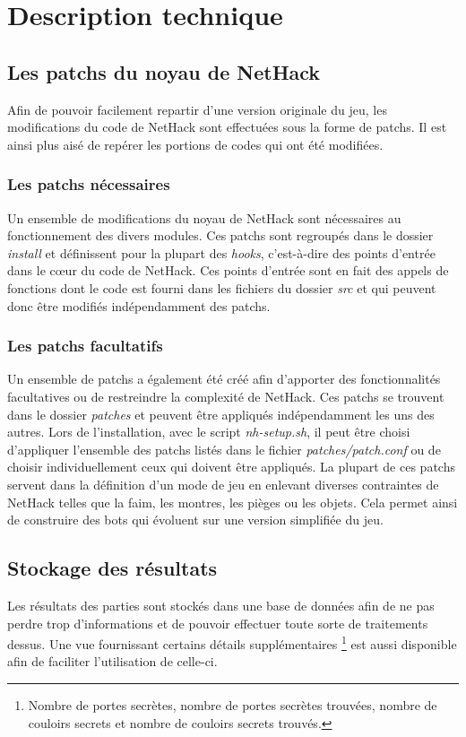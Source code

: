 \documentclass[10pt,a4paper]{report}
\begin{document}
\chapter{Description technique}
\section{Les patchs du noyau de NetHack}
Afin de pouvoir facilement repartir d'une version originale du jeu, les
modifications du code de NetHack sont effectuées sous la forme de patchs. Il
est ainsi plus aisé de repérer les portions de codes qui ont été modifiées.

\subsection{Les patchs nécessaires}
Un ensemble de modifications du noyau de NetHack sont nécessaires au
fonctionnement des divers modules. Ces patchs sont regroupés dans le dossier
\emph{install} et définissent pour la plupart des \emph{hooks}, c'est-à-dire des
points d'entrée dans le cœur du code de NetHack. Ces points d'entrée sont en
fait des appels de fonctions dont le code est fourni dans les fichiers du
dossier \emph{src} et qui peuvent donc être modifiés indépendamment des patchs.

\subsection{Les patchs facultatifs}
Un ensemble de patchs a également été créé afin d'apporter des fonctionnalités
facultatives ou de restreindre la complexité de NetHack. Ces patchs se
trouvent dans le dossier \emph{patches} et peuvent être appliqués
indépendamment les uns des autres. Lors de l'installation, avec le script
\emph{nh-setup.sh}, il peut être choisi d'appliquer l'ensemble des patchs
listés dans le fichier \emph{patches/patch.conf} ou de choisir
individuellement ceux qui doivent être appliqués.
La plupart de ces patchs servent dans la définition d'un mode de jeu en
enlevant diverses contraintes de NetHack telles que la faim, les montres, les
pièges ou les objets. Cela permet ainsi de construire des bots qui évoluent sur
une version simplifiée du jeu.

\section{Stockage des résultats}
Les résultats des parties sont stockés dans une base de données afin de ne pas perdre
trop d'informations et de pouvoir effectuer toute sorte de traitements dessus. Une vue
fournissant certains détails supplémentaires \footnote{Nombre de portes secrètes,
nombre de portes secrètes trouvées, nombre de couloirs secrets et nombre de couloirs
secrets trouvés.} est aussi disponible afin de faciliter l'utilisation de celle-ci.
\end{document}
